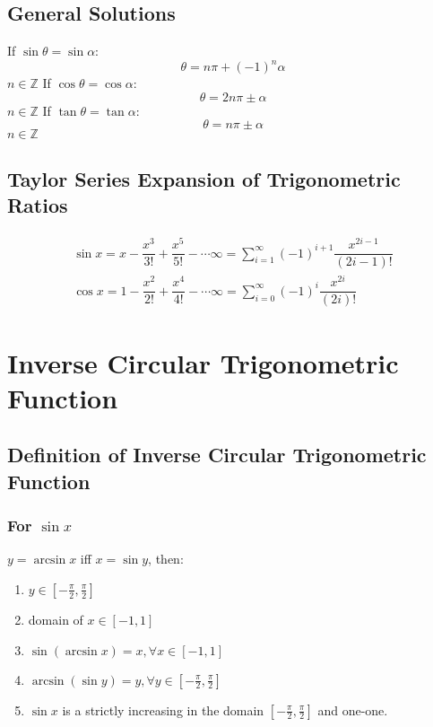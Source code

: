 \documentclass[openany, oneside]{book}
\begin{document}
\section{General Solutions}
If $\sin \theta=\sin \alpha$:
\begin{equation}
\theta=n\pi+(-1)^n\alpha
\end{equation}$n\in\mathbb{Z}$\newline
If $\cos \theta=\cos \alpha$:
\begin{equation}
\theta=2n\pi\pm\alpha
\end{equation}$n\in\mathbb{Z}$\newline
If $\tan \theta=\tan \alpha$:
\begin{equation}
\theta=n\pi\pm\alpha
\end{equation}$n\in\mathbb{Z}$

\section{Taylor Series Expansion of Trigonometric Ratios}
\begin{align}
\sin x=x-\dfrac{x^3}{3!}+\dfrac{x^5}{5!}-\cdots\infty=\sum_{i=1}^\infty (-1)^{i+1}\dfrac{x^{2i-1}}{(2i-1)!}\\
\cos x=1-\dfrac{x^2}{2!}+\dfrac{x^4}{4!}-\cdots\infty=\sum_{i=0}^\infty (-1)^i\dfrac{x^{2i}}{(2i)!}
\end{align}

\large{\chapter{Inverse Circular Trigonometric Function}}
\section{Definition of Inverse Circular Trigonometric Function}
\subsection{For $\sin x$}
$y=\arcsin x$ iff $x=\sin y$, then:
\begin{enumerate}
\item $y \in [-\frac{\pi}{2},\frac{\pi}{2}]$
\item domain of $x \in [-1,1]$
\item $\sin(\arcsin x)=x,\forall x\in[-1,1]$
\item $\arcsin(\sin y)=y, \forall y\in [-\frac{\pi}{2},\frac{\pi}{2}]$
\item $\sin x$ is a strictly increasing in the domain $[-\frac{\pi}{2},\frac{\pi}{2}]$ and one-one.
\end{enumerate}
\end{document}
